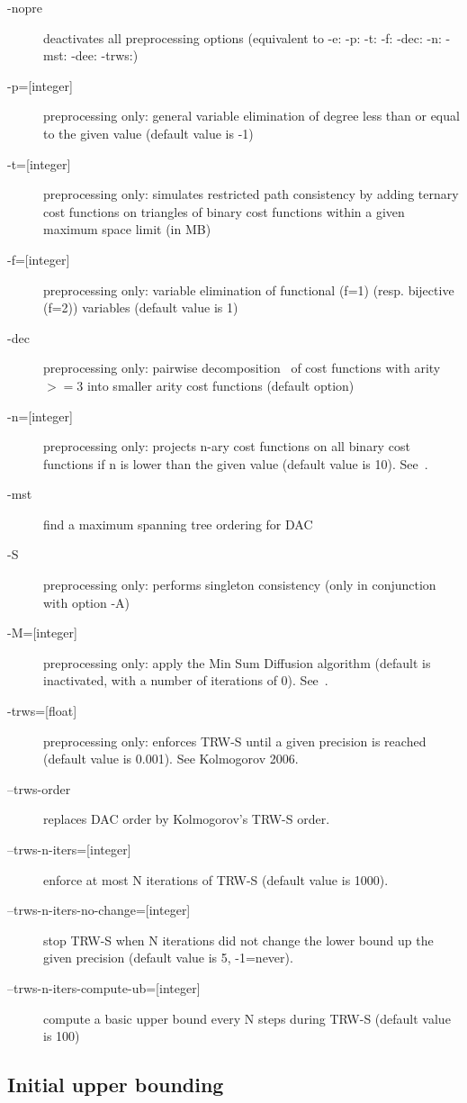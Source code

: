 \documentclass{article}
\begin{document}
\begin{description}
\item[{-nopre}] deactivates all preprocessing options (equivalent to -e:
  -p: -t: -f: -dec: -n: -mst: -dee: -trws:)
\item[{-p=[integer]}]preprocessing only: general variable elimination
  of degree less than or equal to the given value (default value is
  -1)
\item[{-t=[integer]}] preprocessing only: simulates restricted path
  consistency by adding ternary cost functions on triangles of binary
  cost functions within a given maximum space limit (in MB)
\item[{-f=[integer]}] preprocessing only: variable elimination of
  functional (f=1) (resp. bijective (f=2)) variables (default value is
  1)
\item[{-dec}] preprocessing only: pairwise decomposition~\cite{Favier11a} of cost
  functions with arity $>=3$ into smaller arity cost functions (default
  option)
\item[{-n=[integer]}] preprocessing only: projects n-ary cost functions
  on all binary cost functions if n is lower than the given value
  (default value is 10). See~\cite{Favier11a}.
\item[{-mst}] find a maximum spanning tree ordering for DAC
\item[{-S}] preprocessing only: performs singleton consistency (only in conjunction with option -A)
\item[{-M=[integer]}] preprocessing only: 
  apply the Min Sum Diffusion algorithm (default is inactivated, with
  a number of iterations of 0). See~\cite{Cooper10a}.
\item[{-trws=[float]}] 
  preprocessing only: enforces TRW-S until a given precision is reached (default value is 0.001). See Kolmogorov 2006.
\item[{--trws-order}] replaces DAC order by Kolmogorov's TRW-S order. 
\item[{--trws-n-iters=[integer]}] enforce at most N iterations of TRW-S (default value is 1000).
\item[{--trws-n-iters-no-change=[integer]}] stop TRW-S when N iterations did not change the lower bound up the given precision (default value is 5, -1=never).
\item[{--trws-n-iters-compute-ub=[integer]}] compute a basic upper bound every N steps during TRW-S (default value is 100)
 \end{description}


\subsection{Initial upper bounding}
\end{document}
